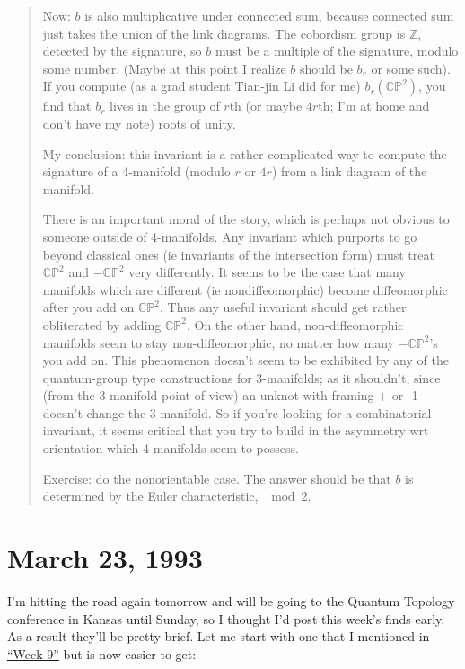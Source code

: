 \documentclass[12pt]{article}
\begin{document}
\begin{quote}
Now: \(b\) is also multiplicative under connected sum, because connected
sum just takes the union of the link diagrams. The cobordism group is
\(\mathbb{Z}\), detected by the signature, so \(b\) must be a multiple
of the signature, modulo some number. (Maybe at this point I realize
\(b\) should be \(b_r\) or some such). If you compute (as a grad student
Tian-jin Li did for me) \(b_r(\mathbb{CP}^2)\), you find that \(b_r\)
lives in the group of \(r\)th (or maybe \(4r\)th; I'm at home and don't
have my note) roots of unity.

My conclusion: this invariant is a rather complicated way to compute the
signature of a 4-manifold (modulo \(r\) or \(4r\)) from a link diagram
of the manifold.

There is an important moral of the story, which is perhaps not obvious
to someone outside of 4-manifolds. Any invariant which purports to go
beyond classical ones (ie invariants of the intersection form) must
treat \(\mathbb{CP}^2\) and \(-\mathbb{CP}^2\) very differently. It
seems to be the case that many manifolds which are different (ie
nondiffeomorphic) become diffeomorphic after you add on
\(\mathbb{CP}^2\). Thus any useful invariant should get rather
obliterated by adding \(\mathbb{CP}^2\). On the other hand,
non-diffeomorphic manifolds seem to stay non-diffeomorphic, no matter
how many \(-\mathbb{CP}^2\)'s you add on. This phenomenon doesn't seem
to be exhibited by any of the quantum-group type constructions for
3-manifolds; as it shouldn't, since (from the 3-manifold point of view)
an unknot with framing + or -1 doesn't change the 3-manifold. So if
you're looking for a combinatorial invariant, it seems critical that you
try to build in the asymmetry wrt orientation which 4-manifolds seem to
possess.

Exercise: do the nonorientable case. The answer should be that \(b\) is
determined by the Euler characteristic, \(\mod 2\).
\end{quote}



\hypertarget{week11}{%
\section{March 23, 1993}\label{week11}}

I'm hitting the road again tomorrow and will be going to the Quantum
Topology conference in Kansas until Sunday, so I thought I'd post this
week's finds early. As a result they'll be pretty brief. Let me start
with one that I mentioned in \protect\hyperlink{week9}{``Week 9''} but
is now easier to get:
\end{document}
